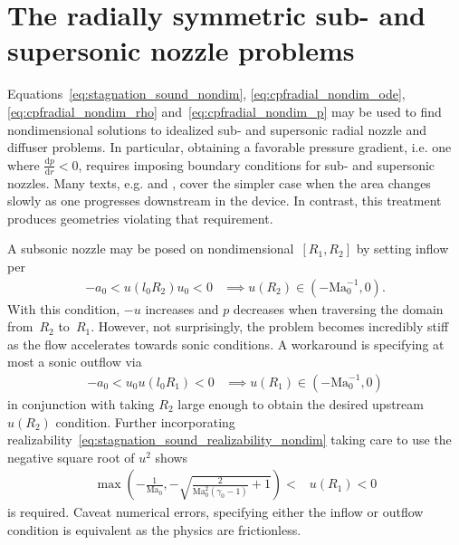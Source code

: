 \documentclass[letterpaper,11pt,nointlimits,reqno]{amsart}
\newcommand{\Mach}[1][]{\mbox{Ma}_{#1}}
\begin{document}
\section{The radially symmetric sub- and supersonic nozzle problems}

Equations~\eqref{eq:stagnation_sound_nondim}, \eqref{eq:cpfradial_nondim_ode},
\eqref{eq:cpfradial_nondim_rho} and~\eqref{eq:cpfradial_nondim_p} may be used
to find nondimensional solutions to idealized sub- and supersonic radial nozzle
and diffuser problems.  In particular, obtaining a favorable pressure gradient,
i.e. one where $\frac{\mathrm{d}p}{\mathrm{d}r} < 0$, requires imposing
boundary conditions for sub- and supersonic nozzles.  Many texts, e.g.
\citet[\textsection{}9.4]{White1999Fluid} and
\citet[\textsection{}97]{Landau2004Fluid}, cover the simpler case when the area
changes slowly as one progresses downstream in the device.  In contrast, this
treatment produces geometries violating that requirement.

A subsonic nozzle may be posed on nondimensional~$\left[R_{1}, R_{2}\right]$ by
setting inflow per
\begin{align}
    -a_0 < u\!\left(l_0 R_{2}\right) u_0 < 0
    &\implies
    u\!\left(R_{2}\right) \in \left(-\Mach[0]^{-1}, 0\right)
.
\end{align}
With this condition, $-u$ increases and $p$ decreases when traversing the
domain from~$R_{2}$ to~$R_{1}$.  However, not surprisingly, the problem becomes
incredibly stiff as the flow accelerates towards sonic conditions.  A
workaround is specifying at most a sonic outflow via
\begin{align}
    -a_0 < u_0 u\!\left(l_0 R_1\right) < 0
    &\implies
    u\!\left(R_1\right) \in \left(-\Mach[0]^{-1}, 0\right)
\end{align}
in conjunction with taking $R_{2}$ large enough to obtain the desired upstream
$u\!\left(R_{2}\right)$ condition.  Further incorporating
realizability~\eqref{eq:stagnation_sound_realizability_nondim} taking care to
use the negative square root of $u^2$ shows
\begin{align}
  \max\left(
    -\frac{1}{\Mach[0]}, -\sqrt{\frac{2}{\Mach[0]^2\left(\gamma_0-1\right)}+1}
  \right) < &u\!\left(R_1\right) < 0
\label{eq:cpfradial_nozzle_subsonic_bc}
\end{align}
is required.  Caveat numerical errors, specifying either the inflow or outflow
condition is equivalent as the physics are frictionless.
\end{document}
